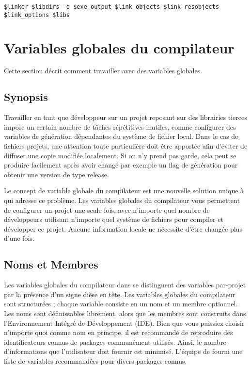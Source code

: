 \begin{lstlisting}
$linker $libdirs -o $exe_output $link_objects $link_resobjects 
$link_options $libs
\end{lstlisting}

\section{Variables globales du compilateur}\label{sec:global_variables}

Cette section décrit comment travailler avec des variables globales.

\subsection{Synopsis}

Travailler en tant que développeur sur un projet reposant sur des librairies tierces impose un certain nombre de tâches répétitives inutiles, comme configurer des variables de génération dépendantes du système de fichier local. Dans le cas de fichiers projets, une attention toute particulière doit être apportée afin d'éviter de diffuser une copie modifiée localement. Si on n'y prend pas garde, cela peut se produire facilement après avoir changé par exemple un flag de génération  pour obtenir une version de type release.

Le concept de variable globale du compilateur est une nouvelle solution unique à \codeblocks qui adresse ce problème. Les variables globales du compilateur vous permettent de configurer un projet une seule fois, avec n'importe quel nombre de développeurs utilisant n'importe quel système de fichiers pour compiler et développer ce projet. Aucune information locale ne nécessite d'être changée plus d'une fois.

\subsection{Noms et Membres}

Les variables globales du compilateur dans \codeblocks se distinguent des variables par-projet par la présence d'un signe dièse en tête. Les variables globales du compilateur sont structurées ; chaque variable consiste en un nom et un membre optionnel. Les noms sont définissables librement, alors que les membres sont construits dans l'Environnement Intégré de Développement (IDE). Bien que vous puissiez choisir n'importe quoi comme nom en principe, il est recommandé de reproduire des identificateurs connus de packages communément utilisés. Ainsi, le nombre d'informations que l'utilisateur doit fournir est minimisé. L'équipe de \codeblocks fourni une liste de variables recommandées pour divers packages connus.

